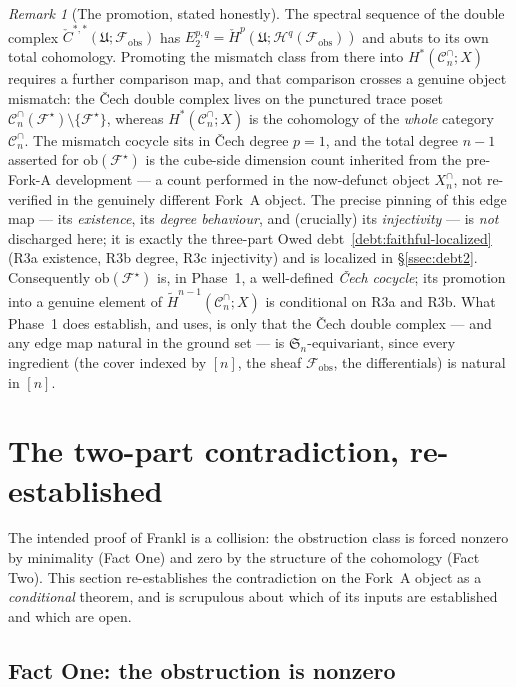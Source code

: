 \documentclass[11pt,oneside]{amsart}
\theoremstyle{plain}
\theoremstyle{definition}
\theoremstyle{remark}
\newtheorem{remark}[theorem]{Remark}
\theoremstyle{honeststyle}
\newcommand{\F}{\mathcal{F}}
\newcommand{\Fstar}{\F^{\star}}
\newcommand{\Sym}{\mathfrak{S}}
\newcommand{\Cn}{\mathcal{C}^{\cap}_n}
\newcommand{\ob}{\mathrm{ob}}
\newcommand{\fobs}{\mathcal{F}_{\mathrm{obs}}}
\begin{document}
\begin{remark}[The promotion, stated honestly]
\label{rem:promotion}
The spectral sequence of the double complex
$\check C^{*,*}(\mathfrak U;\fobs)$ has $E_2^{p,q}=\check
H^{p}(\mathfrak U;\mathcal H^{q}(\fobs))$ and abuts to its own total
cohomology. Promoting the mismatch class from there into
$H^{*}(\Cn;X)$ requires a further comparison map, and that comparison
crosses a genuine object mismatch: the \v{C}ech double complex lives
on the punctured trace poset $\Cn(\Fstar)\setminus\{\Fstar\}$, whereas
$H^{*}(\Cn;X)$ is the cohomology of the \emph{whole} category $\Cn$.
The mismatch cocycle sits in \v{C}ech degree $p=1$, and the total
degree $n-1$ asserted for $\ob(\Fstar)$ is the cube-side dimension
count inherited from the pre-Fork-A development --- a count performed
in the now-defunct object $X^{\cap}_n$, not re-verified in the
genuinely different Fork~A object. The precise pinning of this edge
map --- its \emph{existence}, its \emph{degree behaviour}, and
(crucially) its \emph{injectivity} --- is \emph{not} discharged here;
it is exactly the three-part Owed debt~\ref{debt:faithful-localized}
(R3a existence, R3b degree, R3c injectivity) and is localized in
\S\ref{ssec:debt2}. Consequently $\ob(\Fstar)$ is, in Phase~1, a
well-defined \emph{\v{C}ech cocycle}; its promotion into a genuine
element of $\widetilde H^{n-1}(\Cn;X)$ is conditional on R3a and R3b.
What Phase~1 does establish, and uses, is only that the \v{C}ech
double complex --- and any edge map natural in the ground set --- is
$\Sym_n$-equivariant, since every ingredient (the cover indexed by
$[n]$, the sheaf $\fobs$, the differentials) is natural in $[n]$.
\end{remark}

\section{The two-part contradiction, re-established}
\label{sec:contradiction}

The intended proof of Frankl is a collision: the obstruction class is
forced nonzero by minimality (Fact One) and zero by the structure of
the cohomology (Fact Two). This section re-establishes the
contradiction on the Fork~A object as a \emph{conditional} theorem,
and is scrupulous about which of its inputs are established and which
are open.

\subsection{Fact One: the obstruction is nonzero}
\label{ssec:fact-one}
\end{document}
